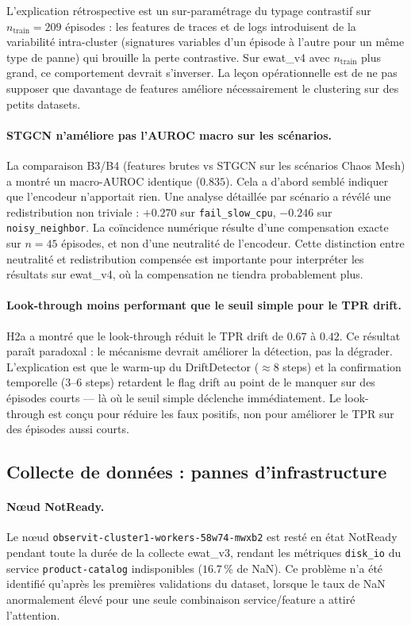 L'explication rétrospective est un sur-paramétrage du typage contrastif sur
$n_\text{train} = 209$ épisodes : les features de traces et de logs introduisent
de la variabilité intra-cluster (signatures variables d'un épisode à l'autre pour un
même type de panne) qui brouille la perte contrastive. Sur ewat\_v4 avec
$n_\text{train}$ plus grand, ce comportement devrait s'inverser.
La leçon opérationnelle est de ne pas supposer que davantage de features améliore
nécessairement le clustering sur des petits datasets.

\paragraph{STGCN n'améliore pas l'AUROC macro sur les scénarios.}
La comparaison B3/B4 (features brutes vs STGCN sur les scénarios Chaos Mesh)
a montré un macro-AUROC identique ($0.835$). Cela a d'abord semblé indiquer que
l'encodeur n'apportait rien. Une analyse détaillée par scénario a révélé une
redistribution non triviale : $+0.270$ sur \texttt{fail\_slow\_cpu},
$-0.246$ sur \texttt{noisy\_neighbor}. La coïncidence numérique résulte d'une
compensation exacte sur $n = 45$ épisodes, et non d'une neutralité de l'encodeur.
Cette distinction entre neutralité et redistribution compensée est importante pour
interpréter les résultats sur ewat\_v4, où la compensation ne tiendra probablement plus.

\paragraph{Look-through moins performant que le seuil simple pour le TPR drift.}
H2a a montré que le look-through réduit le TPR drift de $0.67$ à $0.42$.
Ce résultat paraît paradoxal : le mécanisme devrait améliorer la détection, pas la
dégrader. L'explication est que le warm-up du DriftDetector ($\approx 8$ steps) et la
confirmation temporelle ($3$--$6$ steps) retardent le flag drift au point de le manquer
sur des épisodes courts --- là où le seuil simple déclenche immédiatement.
Le look-through est conçu pour réduire les faux positifs, non pour améliorer le TPR
sur des épisodes aussi courts.

\subsection{Collecte de données : pannes d'infrastructure}
\label{sec:diff_infra}

\paragraph{Nœud NotReady.}
Le nœud \texttt{observit-cluster1-workers-58w74-mwxb2} est resté en état NotReady
pendant toute la durée de la collecte ewat\_v3, rendant les métriques \texttt{disk\_io}
du service \texttt{product-catalog} indisponibles ($16.7$\,\% de NaN).
Ce problème n'a été identifié qu'après les premières validations du dataset, lorsque
le taux de NaN anormalement élevé pour une seule combinaison service/feature a attiré
l'attention.

